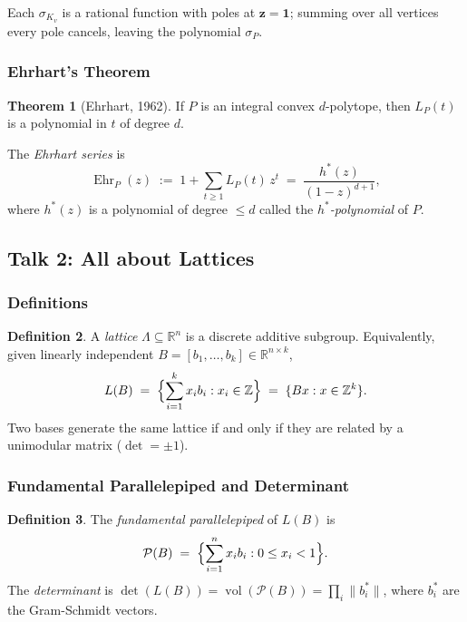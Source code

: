 \documentclass[12pt]{article}
\theoremstyle{definition}
\newtheorem{defn}{Definition}[section]
\newtheorem{thm}[defn]{Theorem}
\theoremstyle{remark}
\newcommand{\Z}{\mathbb{Z}}
\newcommand{\R}{\mathbb{R}}
\newcommand{\Ehr}{\operatorname{Ehr}}
\newcommand{\vol}{\operatorname{vol}}
\begin{document}
Each $\sigma_{K_v}$ is a rational function with poles at
$\mathbf{z}=\mathbf{1}$; summing over all vertices every pole
cancels, leaving the polynomial $\sigma_P$.

\subsubsection{Ehrhart's Theorem}

\begin{thm}[Ehrhart, 1962]
If $P$ is an integral convex $d$-polytope, then $L_P(t)$ is a
polynomial in $t$ of degree $d$.
\end{thm}

The \emph{Ehrhart series} is
\[
  \Ehr_P(z)
  \;:=\;
  1 + \sum_{t \geq 1} L_P(t)\,z^t
  \;=\;
  \frac{h^*(z)}{{(1-z)}^{d+1}},
\]
where $h^*(z)$ is a polynomial of degree $\leq d$ called the
\emph{$h^*$-polynomial} of $P$.

\subsection{Talk 2: All about Lattices}

\subsubsection{Definitions}

\begin{defn}
A \emph{lattice} $\Lambda \subseteq \R^n$ is a discrete additive
subgroup. Equivalently, given linearly independent
$B=[b_1,\ldots,b_k]\in\R^{n\times k}$,
\[
  L(B) \;=\; \Bigl\{\sum_{i=1}^k x_i b_i : x_i\in\Z\Bigr\}
          \;=\; \{Bx : x\in\Z^k\}.
\]
Two bases generate the same lattice if and only if they are related
by a unimodular matrix ($\det = \pm 1$).
\end{defn}

\subsubsection{Fundamental Parallelepiped and Determinant}

\begin{defn}
The \emph{fundamental parallelepiped} of $L(B)$ is
\[
  \mathcal{P}(B)
  \;=\;
  \Bigl\{\sum_{i=1}^n x_i b_i : 0 \leq x_i < 1\Bigr\}.
\]
The \emph{determinant} is
$\det(L(B)) = \vol(\mathcal{P}(B)) = \prod_i \|b_i^*\|$,
where $b_i^*$ are the Gram-Schmidt vectors.
\end{defn}
\end{document}
